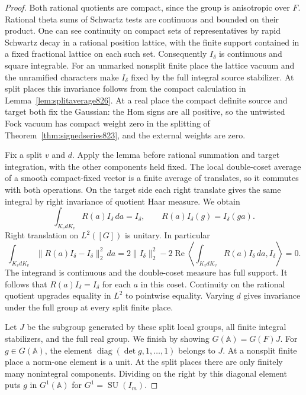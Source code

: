 \documentclass[a4paper,11pt]{article}
\theoremstyle{definition}
\theoremstyle{remark}
\numberwithin{equation}{section}
\begin{document}
\begin{proof}
Both rational quotients are compact, since the group is
anisotropic over \(F\). Rational theta sums of Schwartz tests
are continuous and bounded on their product. One can see
continuity on compact sets of representatives by rapid
Schwartz decay in a rational position lattice, with the
finite support contained in a fixed fractional lattice
on each such set. Consequently \(I_\delta\) is continuous
and square integrable. For an unmarked nonsplit finite place
the lattice vacuum and the unramified characters make
\(I_\delta\) fixed by the full integral source stabilizer.
At split places this invariance follows from the compact
calculation in Lemma~\ref{lem:splitaverage826}. At a real place
the compact definite source and target both fix the Gaussian:
the Hom signs are all positive, so the untwisted Fock vacuum
has compact weight zero in the splitting of
Theorem~\ref{thm:signedseries823}, and the external weights
are zero.

Fix a split \(v\) and \(d\). Apply the lemma before rational
summation and target integration, with the other components
held fixed. The local double-coset average of a smooth
compact-fixed vector is a finite average of translates,
so it commutes with both operations. On the target side
each right translate gives the same integral by right
invariance of quotient Haar measure. We obtain
\[
     \int_{K_vdK_v} R(a)I_\delta\,da=I_\delta,\qquad
                       R(a)I_\delta(g)=I_\delta(ga).
\]
Right translation on \(L^2([G])\) is unitary. In particular
\[
 \int_{K_vdK_v}\|R(a)I_\delta-I_\delta\|_2^2\,da
     =2\|I_\delta\|_2^2-
       2\operatorname{Re}\left\langle
        \int_{K_vdK_v} R(a)I_\delta\,da,I_\delta\right\rangle=0.
\]
The integrand is continuous and the double-coset measure has
full support. It follows that \(R(a)I_\delta=I_\delta\) for
each \(a\) in this coset. Continuity on the rational quotient
upgrades equality in \(L^2\) to pointwise equality. Varying
\(d\) gives invariance under the full group at every split
finite place.

Let \(J\) be the subgroup generated by these split local
groups, all finite integral stabilizers, and the full real
group. We finish by showing \(G(\mathbb A)=G(F)J\).
For \(g\in G(\mathbb A)\), the element
\(\operatorname{diag}(\det g,1,\ldots,1)\) belongs to \(J\).
At a nonsplit finite place a norm-one element is a unit.
At the split places there are only finitely many nonintegral
components. Dividing on the right by this diagonal element
puts \(g\) in \(G^1(\mathbb A)\) for \(G^1=\operatorname{SU}(I_m)\).


\end{proof}
\end{document}
